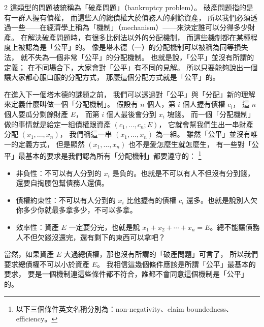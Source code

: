 \documentclass[10pt]{article}
\begin{document}
\begin{multicols*}{2}
這類型的問題被統稱為「破產問題」（bankruptcy problem）。
破產問題指的是有一群人握有債權，
而這些人的總債權大於債務人的剩餘資產，
所以我們必須透過一些——在經濟學上稱為「機制」（mechanism）——來決定誰可以分得多少財產。
在解決破產問題時，有很多\textsf{比例法}以外的分配機制，
而這些機制都在某種程度上被認為是「公平」的。
像是\textsf{塔木德（一）}的分配機制可以被稱為\textsf{同等損失法}，
就不失為一個非常「公平」的分配機制。
也就是說，「公平」並沒有所謂的定義；
在不同場合下，大家會對「公平」有不同的見解。
所以只要能夠說出一個讓大家都心服口服的分配方式，
那麼這個分配方式就是「公平」的。

在進入下一個塔木德的謎題之前，
我們可以透過對「公平」與「分配」新的理解來定義什麼叫做一個「分配機制」。
假設有 $n$ 個人，第 $i$ 個人握有債權 $c_i$，
這 $n$ 個人要瓜分剩餘財產 $E$，
而第 $i$ 個人最後會分到 $x_i$ 塊錢。
而一個「分配機制」做的事情就是給定一組債權跟資產 $(c_1,...,c_n;E)$，
它就會幫我們生出一串財產分配 $(x_1,...,x_n)$，
我們稱這一串 $(x_1,...,x_n)$ 為一組。
雖然「公平」並沒有唯一的定義方式，
但是顯然 $(x_1,...,x_n)$ 也不是愛怎麼生就怎麼生，
有一些對「公平」最基本的要求是我們認為所有「分配機制」都要遵守的：
\footnote{以下三個條件英文名稱分別為：non-negativity、claim boundedness、efficiency。}
\begin{itemize}
	\item \textsf{非負性}：不可以有人分到的 $x_i$ 是負的。也就是不可以有人不但沒有分到錢，還要自掏腰包幫債務人還債。
	\item \textsf{債權約束性}：不可以有人分到的 $x_i$ 比他握有的債權 $c_i$ 還多。也就是說別人欠你多少你就最多拿多少，不可以多拿。
	\item \textsf{效率性}：資產 $E$ 一定要分完，也就是說 $x_1 + x_2 + \cdots + x_n = E$。總不能讓債務人不但欠錢沒還完，還有剩下的東西可以拿吧？
\end{itemize}
當然，如果資產 $E$ 大過總債權，那也沒有所謂的「破產問題」可言了，
所以我們要求總債權不可以小於資產 $E$。
我相信這幾個條件應該是所謂「公平」最基本的要求，
要是一個機制連這些條件都不符合，誰都不會同意這個機制是「公平」的。


\end{multicols*}
\end{document}

